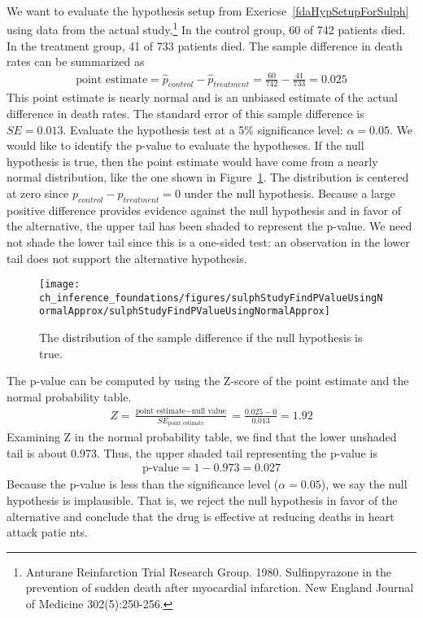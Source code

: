 \begin{example}{We want to evaluate the hypothesis setup from Exericse~\ref{fdaHypSetupForSulph} using data from the actual study.\footnote{Anturane Reinfarction Trial Research Group. 1980. Sulfinpyrazone in the prevention of sudden death after myocardial infarction. New England Journal of Medicine 302(5):250-256.} In the control group, 60 of 742 patients died. In the treatment group, 41 of 733 patients died. The sample difference in death rates can be summarized as
\begin{eqnarray*}
\text{point estimate} = \hat{p}_{control} - \hat{p}_{treatment} = \frac{60}{742} - \frac{41}{733} = 0.025
\end{eqnarray*}
This point estimate is nearly normal and is an unbiased estimate of the actual difference in death rates. The standard error of this sample difference is $SE = 0.013$. Evaluate the hypothesis test at a 5\% significance level: $\alpha=0.05$.}
We would like to identify the p-value to evaluate the hypotheses. If the null hypothesis is true, then the point estimate would have come from a nearly normal distribution, like the one shown in Figure~\ref{sulphStudyFindPValueUsingNormalApprox}. The distribution is centered at zero since $p_{control}-p_{treatment}=0$ under the null hypothesis. Because a large positive difference provides evidence against the null hypothesis and in favor of the alternative, the upper tail has been shaded to represent the p-value. We need not shade the lower tail since this is a one-sided test: an observation in the lower tail does not support the alternative hypothesis.

\begin{figure}[bt]
   \centering
   \texttt{[image: ch\_inference\_foundations/figures/sulphStudyFindPValueUsingNormalApprox/sulphStudyFindPValueUsingNormalApprox]}
   \caption{The distribution of the sample difference if the null hypothesis is true.}
   \label{sulphStudyFindPValueUsingNormalApprox}
\end{figure}

The p-value can be computed by using the Z-score of the point estimate and the normal probability table.
\begin{eqnarray}
Z = \frac{\text{point estimate} - \text{null value}}{SE_{\text{point estimate}}}
  = \frac{0.025 - 0}{0.013} = 1.92
\label{zScoreOfPointEstimateForSulphinpyrazoneThisIsFirstTestStatReference}
\end{eqnarray}
Examining Z in the normal probability table, we find that the lower unshaded tail is about 0.973. Thus, the upper shaded tail representing the p-value is
\begin{eqnarray*}
\text{p-value} = 1-0.973 = 0.027
\end{eqnarray*}
Because the p-value is less than the significance level ($\alpha=0.05$), we say the null hypothesis is implausible. That is, we reject the null hypothesis in favor of the alternative and conclude that the drug is effective at reducing deaths in heart attack patie
nts.
\end{example}

